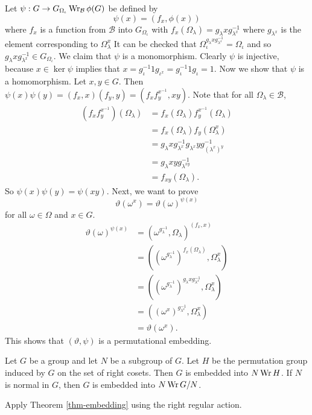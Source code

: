 \begin{sketch}
	Let $\psi:G \to G_{\Omega_\iota} \operatorname{Wr}_{\mathcal{B}} \phi(G)$ be defined by
	\begin{equation*}
		\psi(x) = (f_x,\phi(x))
	\end{equation*}
	where $f_x$ is a function from $\mathcal{B}$ into $G_{\Omega_\iota}$ with $f_x(\Omega_\lambda) = g_{\lambda}xg_{\lambda^x}^{-1}$ where $g_{\lambda^x}$ is the element corresponding to $\Omega_\lambda^x$ It can be checked that $\Omega_\iota^{g_\lambda xg_{\lambda^x}^{-1}} = \Omega_\iota$ and so $g_\lambda xg_{\lambda^x}^{-1}\in G_{\Omega_\iota}$. We claim that $\psi$ is a monomorphism. Clearly $\psi$ is injective, because $x\in \ker \psi$ implies that  $x =g_\iota^{-1} 1 g_{\iota^x} = g_\iota^{-1} 1 g_{\iota} =1$. Now we show that $\psi$ is a homomorphism. Let $x,y\in G$. Then $
		\psi(x)\psi(y) = (f_x,x)(f_y,y) = (f_xf_y^{x^{-1}},xy)$. Note that for all $\Omega_\lambda \in \mathcal{B}$, 
\begin{align*}
	(f_xf_y^{x^{-1}})(\Omega_\lambda) &= f_x(\Omega_\lambda)f_y^{x^{-1}}(\Omega_\lambda) 
	\\
	&= f_x(\Omega_\lambda)f_y(\Omega_\lambda^x) 
	\\
	&= g_{\lambda}xg_{\lambda^x}^{-1}g_{\lambda^x}yg_{(\lambda^{x})^y}^{-1} 
	\\
	&= g_\lambda xy g_{\lambda^{xy}}^{-1} 
	\\
	&= f_{xy}(\Omega_\lambda).
\end{align*}
So $\psi(x)\psi(y) = \psi(xy)$. Next, we want to prove
\begin{equation*}
	\vartheta(\omega^x) = \vartheta(\omega)^{\psi(x)}
\end{equation*}
for all $\omega\in\Omega$ and $x\in G$.
\begin{align*}
	\vartheta(\omega)^{\psi(x)} &= (\omega^{g_\lambda^{-1}},\Omega_\lambda)^{(f_x,x)} 
	\\
	&= ((\omega^{g_\lambda^{-1}})^{f_x(\Omega_\lambda)},\Omega_\lambda^x) 
	\\
	&= ((\omega^{g_\lambda^{-1}})^{g_\lambda x g_{\lambda^x}^{-1}},\Omega_\lambda^x) 
	\\
	&= ((\omega^x)^{g_{\lambda^x}^{-1}},\Omega_\lambda^x) 
	\\
	&= \vartheta(\omega^x).
\end{align*}
This shows that $(\vartheta,\psi)$ is a permutational embedding.
\end{sketch}

\begin{corollary}
	Let $G$ be a group and let $N$ be a subgroup of $G$. Let $H$ be the permutation group induced by $G$ on the set of right cosets. Then $G$ is embedded into $N \operatorname{Wr} H$. If $N$ is normal in $G$, then $G$ is embedded into $N\operatorname{Wr} G/N$.
\end{corollary}
\begin{sketch}
	Apply Theorem \ref{thm-embedding} using the right regular action. 
\end{sketch}


